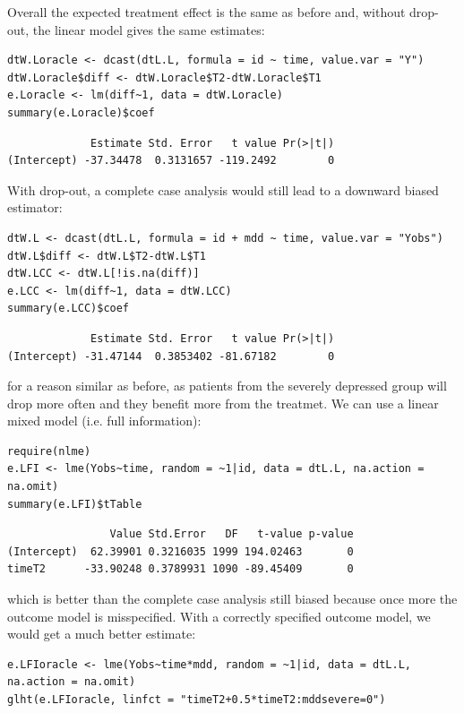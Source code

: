 \documentclass[12pt]{article}
\begin{document}
Overall the expected treatment effect is the same as before and,
without drop-out, the linear model gives the same estimates:
\lstset{language=r,label= ,caption= ,captionpos=b,numbers=none}
\begin{lstlisting}
dtW.Loracle <- dcast(dtL.L, formula = id ~ time, value.var = "Y")
dtW.Loracle$diff <- dtW.Loracle$T2-dtW.Loracle$T1
e.Loracle <- lm(diff~1, data = dtW.Loracle)
summary(e.Loracle)$coef
\end{lstlisting}

\begin{verbatim}
             Estimate Std. Error   t value Pr(>|t|)
(Intercept) -37.34478  0.3131657 -119.2492        0
\end{verbatim}


\bigskip

With drop-out, a complete case analysis would still lead to a downward
biased estimator:
\lstset{language=r,label= ,caption= ,captionpos=b,numbers=none}
\begin{lstlisting}
dtW.L <- dcast(dtL.L, formula = id + mdd ~ time, value.var = "Yobs")
dtW.L$diff <- dtW.L$T2-dtW.L$T1
dtW.LCC <- dtW.L[!is.na(diff)]
e.LCC <- lm(diff~1, data = dtW.LCC)
summary(e.LCC)$coef
\end{lstlisting}

\begin{verbatim}
             Estimate Std. Error   t value Pr(>|t|)
(Intercept) -31.47144  0.3853402 -81.67182        0
\end{verbatim}


for a reason similar as before, as patients from the severely
depressed group will drop more often and they benefit more from the
treatmet. We can use a linear mixed model (i.e. full information):
\lstset{language=r,label= ,caption= ,captionpos=b,numbers=none}
\begin{lstlisting}
require(nlme)
e.LFI <- lme(Yobs~time, random = ~1|id, data = dtL.L, na.action = na.omit)
summary(e.LFI)$tTable
\end{lstlisting}

\begin{verbatim}
                Value Std.Error   DF   t-value p-value
(Intercept)  62.39901 0.3216035 1999 194.02463       0
timeT2      -33.90248 0.3789931 1090 -89.45409       0
\end{verbatim}

which is better than the complete case analysis still biased because
once more the outcome model is misspecified. With a correctly
specified outcome model, we would get a much better estimate:
\lstset{language=r,label= ,caption= ,captionpos=b,numbers=none}
\begin{lstlisting}
e.LFIoracle <- lme(Yobs~time*mdd, random = ~1|id, data = dtL.L, na.action = na.omit)
glht(e.LFIoracle, linfct = "timeT2+0.5*timeT2:mddsevere=0")

\end{lstlisting}
\end{document}
